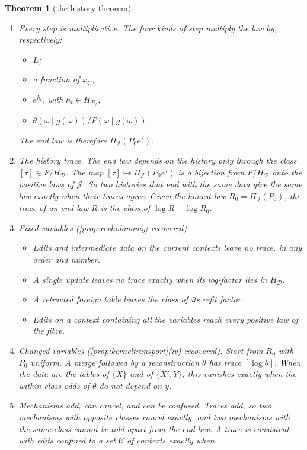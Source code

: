 \documentclass[11pt]{article}
\newtheorem{theorem}{Theorem}\newtheorem{proposition}[theorem]{Proposition}\newtheorem{lemma}[theorem]{Lemma}\newtheorem{corollary}[theorem]{Corollary}\newtheorem{conjecture}[theorem]{Conjecture}\crefname{conjecture}{Conjecture}{Conjectures}
\theoremstyle{definition}\newtheorem{definition}[theorem]{Definition}\newtheorem{remark}[theorem]{Remark}\newtheorem{example}[theorem]{Example}\newtheorem{problem}[theorem]{Open problem}\crefname{problem}{Problem}{Problems}
\begin{document}
\begin{theorem}[the history theorem]\label{thm:history}
\begin{enumerate}
\item[(i)] \emph{Every step is multiplicative.} The four kinds of step multiply the law by, respectively:
\begin{itemize}
\item $L$;
\item a function of $x_C$;
\item $e^{h_t}$, with $h_t\in H_{\mathcal D_t}$;
\item $\theta(\omega\mid g(\omega))/P(\omega\mid g(\omega))$.
\end{itemize}
The end law is therefore $\Pi_{\mathcal J}(P_0e^{\tau})$.
\item[(ii)] \emph{The history trace.} The end law depends on the history only through the class $[\tau]\in F/H_{\mathcal D}$. The map $[\tau]\mapsto\Pi_{\mathcal J}(P_0e^\tau)$ is a bijection from $F/H_{\mathcal D}$ onto the positive laws of $\mathcal J$. So two histories that end with the same data give the same law exactly when their traces agree. Given the honest law $R_0=\Pi_{\mathcal J}(P_0)$, the trace of an end law $R$ is the class of $\log R-\log R_0$.
\item[(iii)] \emph{Fixed variables (\cref{prop:revholonomy} recovered).}
\begin{itemize}
\item Edits and intermediate data on the current contexts leave no trace, in any order and number.
\item A single update leaves no trace exactly when its log-factor lies in $H_{\mathcal D}$.
\item A retracted foreign table leaves the class of its refit factor.
\item Edits on a context containing all the variables reach every positive law of the fibre.
\end{itemize}
\item[(iv)] \emph{Changed variables (\cref{prop:kerneltransport}(iv) recovered).} Start from $R_0$ with $P_0$ uniform. A merge followed by a reconstruction $\theta$ has trace $[\log\theta]$. When the data are the tables of $\{X\}$ and of $\{X',Y\}$, this vanishes exactly when the within-class odds of $\theta$ do not depend on $y$.
\item[(v)] \emph{Mechanisms add, can cancel, and can be confused.} Traces add, so two mechanisms with opposite classes cancel exactly, and two mechanisms with the same class cannot be told apart from the end law. A trace is consistent with edits confined to a set $\mathcal C$ of contexts exactly when

\end{enumerate}
\end{theorem}
\end{document}
